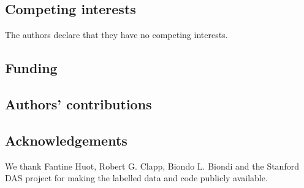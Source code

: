 \subsection*{Competing interests}
The authors declare that they have no competing interests.
\subsection*{Funding}
\subsection*{Authors' contributions}
\subsection*{Acknowledgements}
We thank Fantine Huot, Robert G. Clapp, Biondo L. Biondi and the Stanford DAS project for making the labelled data and code publicly available. %
